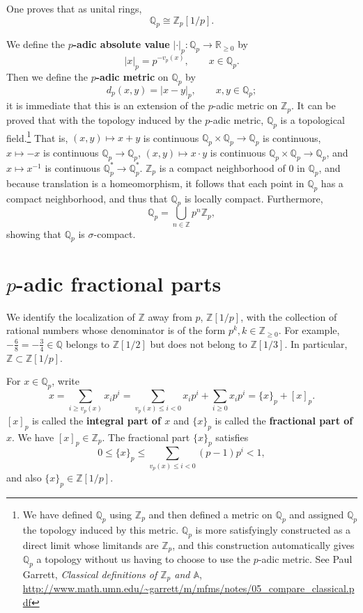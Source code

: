 \documentclass{article}
\theoremstyle{definition}
\begin{document}
One proves that as unital rings,
\[
\mathbb{Q}_p \cong \mathbb{Z}_p[1/p].
\]

We define the \textbf{$p$-adic absolute value} $|\cdot|_p:\mathbb{Q}_p \to \mathbb{R}_{\geq 0}$ by
\[
|x|_p = p^{-v_p(x)}, \qquad x \in \mathbb{Q}_p.
\]
Then we define the \textbf{$p$-adic metric} on $\mathbb{Q}_p$ by
\[
d_p(x,y) = |x-y|_p, \qquad x,y \in \mathbb{Q}_p;
\]
it is immediate that this is an extension of the $p$-adic metric on $\mathbb{Z}_p$. 
It can be proved that with the topology induced by the $p$-adic metric, $\mathbb{Q}_p$ is a topological field.\footnote{We have defined $\mathbb{Q}_p$ using $\mathbb{Z}_p$ and then
defined a metric on $\mathbb{Q}_p$ and assigned $\mathbb{Q}_p$ the topology induced by this metric. $\mathbb{Q}_p$ is more satisfyingly 
constructed as a direct limit whose limitands are $\mathbb{Z}_p$, 
and this construction automatically gives $\mathbb{Q}_p$ a topology without us having to choose to use the $p$-adic metric. See Paul Garrett,
{\em Classical definitions of $\mathbb{Z}_p$ and $\mathbb{A}$},
\url{http://www.math.umn.edu/~garrett/m/mfms/notes/05_compare_classical.pdf}}
 That is,
$(x,y) \mapsto x+y$ is continuous $\mathbb{Q}_p \times
\mathbb{Q}_p \to \mathbb{Q}_p$ is continuous, $x \mapsto -x$ is continuous $\mathbb{Q}_p \to \mathbb{Q}_p$, 
$(x,y) \mapsto x\cdot y$ is continuous $\mathbb{Q}_p \times \mathbb{Q}_p \to \mathbb{Q}_p$, and
$x \mapsto x^{-1}$ is continuous $\mathbb{Q}_p^* \to \mathbb{Q}_p^*$. 
$\mathbb{Z}_p$ is a compact neighborhood of $0$ in $\mathbb{Q}_p$, and because translation is a homeomorphism, it follows that
each point in $\mathbb{Q}_p$ has a compact neighborhood, and thus that $\mathbb{Q}_p$ is locally compact. Furthermore,
\[
\mathbb{Q}_p = \bigcup_{n \in \mathbb{Z}} p^n \mathbb{Z}_p,
\]
showing that $\mathbb{Q}_p$ is $\sigma$-compact.


\section{$p$-adic fractional parts}
We identify the localization of $\mathbb{Z}$ away from $p$, $\mathbb{Z}[1/p]$, with the collection of rational numbers whose denominator is of
the form $p^k, k \in \mathbb{Z}_{\geq 0}$. For example, $-\frac{6}{8} = -\frac{3}{4} \in \mathbb{Q}$ belongs to
$\mathbb{Z}[1/2]$ but does not belong to $\mathbb{Z}[1/3]$. In particular, $\mathbb{Z} \subset \mathbb{Z}[1/p]$. 

For $x \in \mathbb{Q}_p$, write
\[
x=\sum_{i \geq v_p(x)} x_i p^i = \sum_{v_p(x) \leq i < 0} x_i p^i + \sum_{i \geq 0} x_i p^i = \{x\}_p+[x]_p.
\]
$[x]_p$ is called the \textbf{integral part of $x$} and $\{x\}_p$ is called the \textbf{fractional part of $x$}.
We have $[x]_p \in \mathbb{Z}_p$. The fractional part $\{x\}_p$ satisfies
\[
0 \leq \{x\}_p \leq \sum_{v_p(x) \leq i<0} (p-1)p^i <1,
\]
and also $\{x\}_p \in \mathbb{Z}[1/p]$. 
\end{document}
